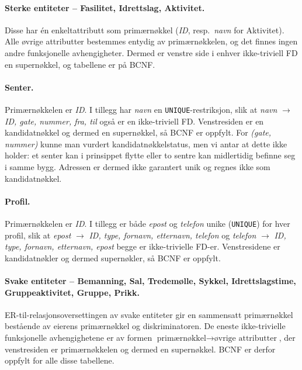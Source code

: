 \paragraph{Sterke entiteter – Fasilitet, Idrettslag, Aktivitet.}
Disse har én enkeltattributt som primærnøkkel (\textit{ID}, resp.\ \textit{navn} for Aktivitet).
Alle øvrige attributter bestemmes entydig av primærnøkkelen, og det finnes ingen andre funksjonelle
avhengigheter. Dermed er venstre side i enhver ikke-triviell FD en supernøkkel, og tabellene er på BCNF.

\paragraph{Senter.}
Primærnøkkelen er \textit{ID}. I tillegg har \textit{navn} en \texttt{UNIQUE}-restriksjon,
slik at \textit{navn} $\rightarrow$ \textit{ID, gate, nummer, fra, til} også er en
ikke-triviell FD. Venstresiden er en kandidatnøkkel og dermed en supernøkkel, så BCNF er oppfylt.
For \textit{(gate, nummer)} kunne man vurdert kandidatnøkkelstatus, men vi antar at
dette ikke holder: et senter kan i prinsippet flytte eller to sentre kan midlertidig befinne seg i
samme bygg. Adressen er dermed ikke garantert unik og regnes ikke som kandidatnøkkel.

\paragraph{Profil.}
Primærnøkkelen er \textit{ID}. I tillegg er både \textit{epost} og \textit{telefon}
unike (\texttt{UNIQUE}) for hver profil, slik at
\textit{epost} $\rightarrow$ \textit{ID, type, fornavn, etternavn, telefon}
og \textit{telefon} $\rightarrow$ \textit{ID, type, fornavn, etternavn, epost}
begge er ikke-trivielle FD-er. Venstresidene er kandidatnøkler og dermed supernøkler,
så BCNF er oppfylt.

\paragraph{Svake entiteter – Bemanning, Sal, Tredemølle, Sykkel, Idrettslagstime, Gruppeaktivitet, Gruppe, Prikk.}
ER-til-relasjonsoversettingen av svake entiteter gir en sammensatt primærnøkkel bestående av
eierens primærnøkkel og diskriminatoren. De eneste ikke-trivielle funksjonelle avhengighetene er
av formen \(\text{primærnøkkel} \rightarrow \text{øvrige attributter}\), der venstresiden er
primærnøkkelen og dermed en supernøkkel. BCNF er derfor oppfylt for alle disse tabellene.


